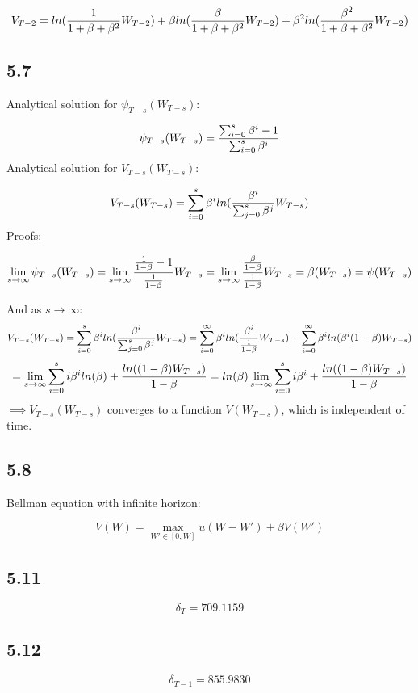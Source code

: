 \documentclass[letterpaper,12pt]{article}
\theoremstyle{definition}
\begin{document}
\[V_{T-2} = ln({1 \over 1+\beta+\beta^2}W_{T-2})+\beta ln({\beta \over 1+\beta+\beta^2}W_{T-2})+ \beta^2 ln({\beta^2 \over 1+\beta+\beta^2}W_{T-2})\]

\subsection*{5.7}

Analytical solution for $\psi_{T-s}(W_{T-s})$:

\[\psi_{T-s}(W_{T-s}) = {\sum_{i=0}^s \beta^i -1 \over \sum_{i=0}^s \beta^i}\]
Analytical solution for $V_{T-s}(W_{T-s})$:

\[V_{T-s}(W_{T-s}) = \sum_{i=0}^s \beta^{i} ln({\beta^{i} \over \sum_{j=0}^s \beta^j} W_{T-s} )       \]
Proofs:

\[\lim_{s\to\infty} \psi_{T-s}(W_{T-s}) = \lim_{s\to\infty} {{1 \over 1-\beta} -1 \over {1 \over 1-\beta}}W_{T-s} = \lim_{s\to\infty} {{\beta \over 1-\beta} \over {1 \over 1-\beta}}W_{T-s} = \beta(W_{T-s}) = \psi(W_{T-s})\]

And as $s \to \infty$:
\[ V_{T-s}(W_{T-s}) = \sum_{i=0}^s \beta^{i} ln({\beta^{i} \over \sum_{j=0}^s \beta^j} W_{T-s} )   
=  \sum_{i=0}^\infty \beta^{i} ln({\beta^{i} \over {1 \over 1-\beta}} W_{T-s} ) - \sum_{i=0}^\infty \beta^{i} ln(\beta^{i} (1-\beta) W_{T-s} ) \]
\[ = \lim_{s\to\infty} \sum_{i=0}^s i\beta^i ln(\beta) + {ln((1-\beta)W_{T-s}) \over 1-\beta}  = ln(\beta)\lim_{s\to\infty} \sum_{i=0}^s i\beta^i  + {ln((1-\beta)W_{T-s}) \over 1-\beta} \]
$\implies V_{T-s}(W_{T-s})$ converges to a function $V(W_{T-s})$, which is independent of time.

\subsection*{5.8}

Bellman equation with infinite horizon:

\[V(W) = \max_{W' \in [0,W]} u(W-W') + \beta V(W')\]

\subsection*{5.11}

\[\delta_T = 709.1159\]

\subsection*{5.12}

\[\delta_{T-1} = 855.9830 \]
\end{document}
